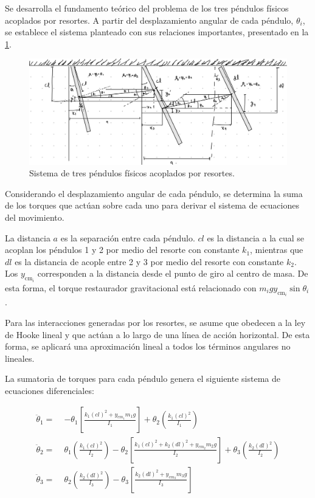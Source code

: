 Se desarrolla el fundamento teórico del problema de los tres péndulos
físicos acoplados por resortes. A partir del desplazamiento angular
de cada péndulo, \(\theta_i\), se establece el sistema planteado con
sus relaciones importantes, presentado en la \cref{fig:sistema-pendulos}.

\begin{figure}[htbp!]
  \centering
  \includegraphics[width=0.8\linewidth]{Figures/IM1.jpeg}
  \caption{Sistema de tres péndulos físicos acoplados por resortes.}
  \label{fig:sistema-pendulos}
\end{figure}

Considerando el desplazamiento angular de cada péndulo, se determina
la suma de los torques que actúan sobre cada uno para derivar el
sistema de ecuaciones del movimiento.

La distancia \( a \) es la separación entre cada péndulo. \( cl \) es
la distancia a la cual se acoplan los péndulos 1 y 2 por medio del
resorte con constante \( k_1 \), mientras que \( dl \) es la distancia
de acople entre 2 y 3 por medio del resorte con constante \( k_2 \).
Los \(y_{\text{cm}}_i\) corresponden a la distancia desde el punto de
giro al centro de masa. De esta forma, el torque restaurador
gravitacional está relacionado con \(m_i g y_{\text{cm}_i} \sin{\theta_i}\).

Para las interacciones generadas por los resortes, se asume que
obedecen a la ley de Hooke lineal y que actúan a lo largo de una
línea de acción horizontal. De esta forma, se aplicará una
aproximación lineal a todos los términos angulares no lineales.

La sumatoria de torques para cada péndulo genera el siguiente
sistema de ecuaciones diferenciales:

\begin{equation}
  \begin{aligned}
    \ddot{\theta}_1 =\; &
    -\theta_1 \left[ \frac{k_1 (cl)^2 + y_{cm_1} m_1 g}{I_1} \right]
    + \theta_2 \left( \frac{k_1 (cl)^2}{I_1} \right) \\[0.5em]
    \ddot{\theta}_2 =\; &
    \theta_1 \left( \frac{k_1 (cl)^2}{I_2} \right)
    - \theta_2 \left[ \frac{k_1 (cl)^2 + k_2 (dl)^2 + y_{cm_2} m_2 g}{I_2} \right]
    + \theta_3 \left( \frac{k_2 (dl)^2}{I_2} \right) \\[0.5em]
    \ddot{\theta}_3 =\; &
    \theta_2 \left( \frac{k_2 (dl)^2}{I_3} \right)
    - \theta_3 \left[ \frac{k_2 (dl)^2 + y_{cm_3} m_3 g}{I_3} \right]
  \end{aligned}
\end{equation}

